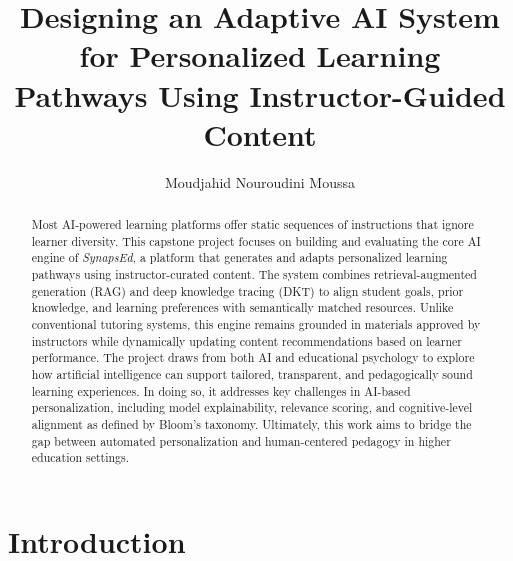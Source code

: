 \documentclass{stylefiles/capstone}
\begin{document}
\title{Designing an Adaptive AI System for Personalized Learning Pathways Using Instructor-Guided Content}


\author{Moudjahid Nouroudini Moussa}


\renewcommand{\shortauthors}{Moudjahid}

\begin{abstract}
Most AI-powered learning platforms offer static sequences of instructions that ignore learner diversity. This capstone project focuses on building and evaluating the core AI engine of \textit{SynapsEd}, a platform that generates and adapts personalized learning pathways using instructor-curated content. The system combines retrieval-augmented generation (RAG) and deep knowledge tracing (DKT) to align student goals, prior knowledge, and learning preferences with semantically matched resources. Unlike conventional tutoring systems, this engine remains grounded in materials approved by instructors while dynamically updating content recommendations based on learner performance. The project draws from both AI and educational psychology to explore how artificial intelligence can support tailored, transparent, and pedagogically sound learning experiences. In doing so, it addresses key challenges in AI-based personalization, including model explainability, relevance scoring, and cognitive-level alignment as defined by Bloom's taxonomy. Ultimately, this work aims to bridge the gap between automated personalization and human-centered pedagogy in higher education settings.
\end{abstract}


\maketitle

\section{Introduction}
\end{document}
